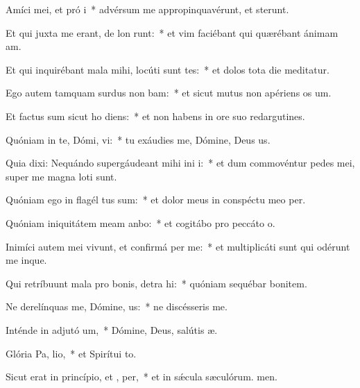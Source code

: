 \item Amíci mei, et pró i~* advérsum me appropinquavérunt, et sterunt.
\item Et qui juxta me erant, de lon runt:~* et vim faciébant qui quærébant ánimam am.
\item Et qui inquirébant mala mihi, locúti sunt tes:~* et dolos tota die meditatur.
\item Ego autem tamquam surdus non bam:~* et sicut mutus non apériens os um.
\item Et factus sum sicut ho  diens:~* et non habens in ore suo redargutines.
\item Quóniam in te, Dómi, vi:~* tu exáudies me, Dómine, Deus us.
\item Quia dixi: Nequándo supergáudeant mihi ini i:~* et dum commovéntur pedes mei, super me magna loti sunt.
\item Quóniam ego in flagél tus sum:~* et dolor meus in conspéctu meo per.
\item Quóniam iniquitátem meam anbo:~* et cogitábo pro peccáto o.
\item Inimíci autem mei vivunt, et confirmá  per me:~* et multiplicáti sunt qui odérunt me inque.
\item Qui retríbuunt mala pro bonis, detra hi:~* quóniam sequébar bonitem.
\item Ne derelínquas me, Dómine,  us:~* ne discésseris  me.
\item Inténde in adjutó um,~* Dómine, Deus, salútis æ.
\item Glória Pa,  lio,~* et Spirítui to.
\item Sicut erat in princípio, et ,  per,~* et in sǽcula sæculórum. men.
